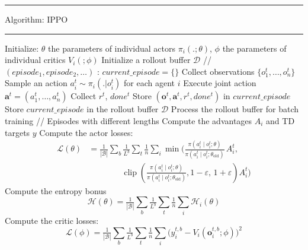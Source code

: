 \documentclass[varwidth, border=20pt]{standalone}
\begin{document}
\begingroup
\small                    
\begin{center}
  \begin{minipage}{0.99\linewidth} 
    \hrule height 0.7pt
    \vspace{3pt}
    Algorithm: IPPO
    \vspace{3pt}
    \hrule height 0.7pt
    \vspace{6pt}

   
    \begin{algorithmic}[1]
      \State Initialize: $\theta$ the parameters of individual actors $\pi_i(.;\theta)$, $\phi$ the parameters of individual critics $V_i(;\phi)$
        \State Initialize a rollout buffer $\mathcal{D}$ // $(episode_1, episode_2, \dots)$
        :
            \State $current\_episode = \{ \}$ 
                \State Collect observations $\{o^t_1,\dots,o^t_n\}$ 
                \State  Sample an action $a_i^t \sim \pi_i(.|o_i^t)$ for each agent $i$
                \State Execute joint action $\mathbf{a}^t = (a_1^t,\dots,a_n^t)$
                \State Collect $r^t$, $done^t$
                \State Store $(\mathbf{o}^t,\mathbf{a}^t,r^t,done^t)$ in $current\_episode$
                \EndWhile
            \State Store $current\_episode$ in the rollout buffer $\mathcal{D}$
        \EndFor
        \State Process the rollout buffer for batch training // Episodes with different lengths
        \State Compute the advantages $A_i$ and TD targets $y$
        \State Compute the actor losses:
        \begin{align*}
            \mathcal{L}(\theta)
                &= \tfrac{1}{|\mathcal{B}|}\sum_b \tfrac{1}{L^b} \sum_t \tfrac{1}{n} \sum_i 
                    \min\!\Bigg(
                        \frac{\pi(a_i^t \mid o_i^t;\theta)}{\pi(a_i^t \mid o_i^t;\theta_{\text{old}})}\, A_i^t, \\
                &\qquad\qquad
                        \operatorname{clip}\!\left(
                            \frac{\pi(a_i^t \mid o_i^t;\theta)}{\pi(a_i^t \mid o_i^t;\theta_{\text{old}})},
                            1-\varepsilon,\,1+\varepsilon
                        \right) A_i^t
                    \Bigg)
            \end{align*}
        \State Compute the entropy bonus
        \Statex
        \[
            \mathcal{H}(\theta) =   \tfrac{1}{|\mathcal{B}|}\sum_b \tfrac{1}{L^b} \sum_t \tfrac{1}{n} \sum_i \mathcal{H}_i(\theta)
        \]
        \State Compute the critic losses: 
        \Statex
          \[
            \mathcal{L}(\phi)=\tfrac{1}{|\mathcal{B}|}\sum_b \tfrac{1}{L^b} \sum_t \tfrac{1}{n} \sum_i \Big(y^{t,b}_i -  V_i(\mathbf{o}^{t,b}_i; \phi)\Big)^2
          \]


\end{algorithmic}
\end{minipage}
\end{center}
\end{document}

